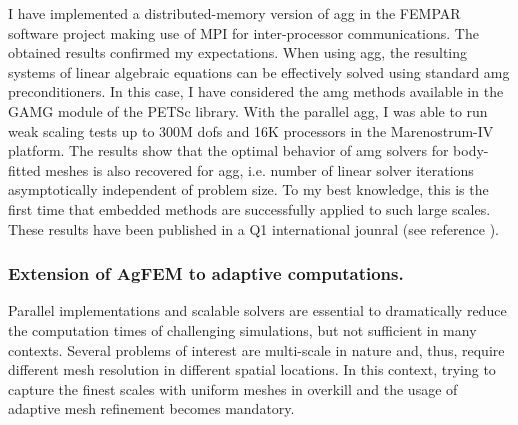 \documentclass{article}
\begin{document}
I have implemented a distributed-memory version of \ac{agg} in the FEMPAR software project  making use of MPI for inter-processor communications. The obtained results confirmed my expectations. When using \ac{agg}, the resulting systems of linear algebraic equations can be effectively solved using standard \ac{amg} preconditioners. In this case, I have considered the \ac{amg} methods available in the GAMG module of the PETSc library. {{With the parallel \ac{agg}, I was able to run  weak scaling tests up to  300M \acp{dof} and 16K processors in the Marenostrum-IV platform}}. The results show that the optimal behavior of \ac{amg} solvers for body-fitted meshes is also recovered for \ac{agg}, i.e. number of linear solver iterations asymptotically independent of problem size. To my best knowledge, this is the first time that embedded methods are successfully applied to such large scales. These results have been published in a { Q1 international jounral} (see reference \cite{Verdugo2019}).

\subsubsection{Extension of AgFEM to adaptive computations.}


Parallel implementations and scalable solvers are essential to dramatically reduce the computation times of challenging simulations, but not sufficient in many contexts. Several problems of interest are multi-scale in nature and, thus, require different mesh resolution in different spatial locations. In this context, trying to capture the finest scales with uniform meshes in overkill and the usage of adaptive mesh refinement becomes mandatory.
\end{document}

